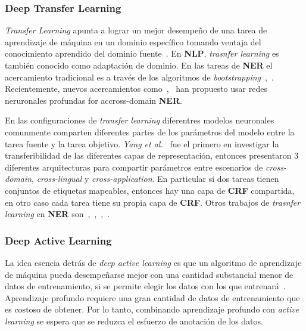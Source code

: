 \subsubsection{Deep Transfer Learning}

\emph{Transfer Learning} apunta a lograr un mejor desempe\~no de una tarea de aprendizaje de m\'aquina en un dominio espec\'ifico tomando ventaja del conocimiento aprendido del dominio fuente~\cite{pan2009survey}. En \textbf{NLP}, \emph{trasnfer learning} es tambi\'en conocido como adaptaci\'on de dominio. En las tareas de \textbf{NER} el acercamiento tradicional es a trav\'es de los algoritmos de \emph{bootstrapping}~\cite{jiang2007instance},~\cite{wu2009domain}. Recientemente, nuevos acercamientos como~\cite{pan2013transfer},~\cite{lee2017transfer} han propuesto usar redes neruronales profundas for accross-domain \textbf{NER}.

En las configuraciones de \emph{transfer learning} diferentres modelos neuronales comunmente comparten diferentes partes de los par\'ametros del modelo entre la tarea fuente y la tarea objetivo. \emph{Yang et al.}~\cite{yang2017transfer} fue el primero en investigar la transferibilidad de las diferentes capas de representaci\'on, entonces presentaron 3 diferentes arquitecturas para compartir par\'ametros entre escenarios de \emph{cross-domain}, \emph{cross-lingual} y  \emph{cross-application}. En particular si dos tareas tienen conjuntos de etiquetas mapeables, entonces hay una capa de \textbf{CRF} compartida, en otro caso cada tarea tiene su propia capa de \textbf{CRF}. Otros trabajos de \emph{trasnfer learning} en \textbf{NER} son~\cite{von2017transfer},~\cite{zhao2018improve},~\cite{lin2018neural},~\cite{giorgi2018transfer}.

\subsubsection{Deep Active Learning}

La idea esencia detr\'as de \emph{deep active learning} es que un algoritmo de aprendizaje de m\'aquina pueda desempe\~narse mejor con una cantidad substancial menor de datos de entrenamiento, si se permite elegir los datos con los que entrenar\'a~\cite{settles2012active}. Aprendizaje profundo requiere una gran cantidad de datos de entrenamiento que es costoso de obtener. Por lo tanto, combinando aprendizaje profundo con \emph{active learning} se espera que se reduzca el esfuerzo de anotaci\'on de los datos.

